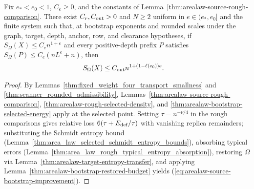 \begin{lemma}
    \label{thm:arealaw-source-bootstrap-entropy}
    \leanok
    Fix $e_*<e_0<1$, $C_e\geq0$, and the constants of Lemma~\ref{thm:arealaw-source-rough-comparison}.
    There exist $C_r,C_{\rm out}>0$ and $N\geq2$ uniform in $e\in(e_*,e_0]$ and the finite system
    such that, at bootstrap exponents and rounded scales under the graph, target, depth, anchor,
    row, and clearance hypotheses, if $S_\Omega(X)\le C_e n^{1+e}$ and every positive-depth
    prefix $P$ satisfies $S_\Omega(P)\le C_e(nL^e+n)$, then
    \begin{align}
        S_\Omega(X) & \leq C_{\rm out}n^{1+(1-\ell(e_0))e}.
        \label{eq:arealaw-source-bootstrap-improvement}
    \end{align}
\end{lemma}
\begin{proof}
    \leanok
    By Lemmas~\ref{thm:fixed_weight_four_transport_smallness} and \ref{thm:scanner_rounded_admissibility},
    Lemmas~\ref{thm:arealaw-source-rough-comparison}, \ref{thm:arealaw-rough-selected-density},
    and \ref{thm:arealaw-bootstrap-selected-energy} apply at the selected point. Setting
    $\tau=n^{-\nu/4}$ in the rough comparisons gives relative loss $6(\tau+E_{\rm def}/\tau)$ with
    vanishing replica remainders; substituting the Schmidt entropy bound
    (Lemma~\ref{thm:area_law_selected_schmidt_entropy_bounds}), absorbing typical errors
    (Lemma~\ref{thm:area_law_rough_typical_entropy_absorption}), restoring $\Omega$ via
    Lemma~\ref{thm:arealaw-target-entropy-transfer}, and applying
    Lemma~\ref{thm:arealaw-bootstrap-restored-budget} yields (\ref{eq:arealaw-source-bootstrap-improvement}).
\end{proof}

